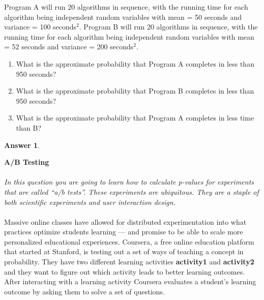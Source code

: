 \documentclass[12pt]{article}
\renewcommand{\(}{\left(}
\renewcommand{\)}{\right)}
\theoremstyle{definition}
\newtheorem*{answer}{Answer}
\begin{document}
\begin{enumerate}
{    %
    \item Program A will run 20 algorithms in sequence, with the running time for each algorithm being independent random variables with mean = 50 seconds and variance = 100 seconds$^2$. Program B will run 20 algorithms in sequence, with the running time for each algorithm being independent random variables with mean = 52 seconds and variance = 200 seconds$^2$.
    \begin{enumerate}
        \item What is the approximate probability that Program A completes in less than 950 seconds?
        \item What is the approximate probability that Program B completes in less than 950 seconds?
        \item What is the approximate probability that Program A completes in less time than B?
    \end{enumerate}
    
    \begin{shaded}
    \begin{answer}
    
    \end{answer}
    \end{shaded}
    \newpage
    
    \textbf{A/B Testing}\\ \\
    \textit{In this question you are going to learn how to calculate p-values for experiments that are called ``a/b tests''. These experiments are ubiquitous. They are a staple of both scientific experiments and user interaction design.}\\ \\
    Massive online classes have allowed for distributed experimentation into what practices optimize students learning --- and promise to be able to scale more personalized educational experiences. Coursera, a free online education platform that started at Stanford, is testing out a set of ways of teaching a concept in probability. They have two different learning activities \textbf{activity1} and \textbf{activity2} and they want to figure out which activity leads to better learning outcomes. After interacting with a learning activity Coursera evaluates a student's learning outcome by asking them to solve a set of questions. 
    
}
\end{enumerate}
\end{document}
